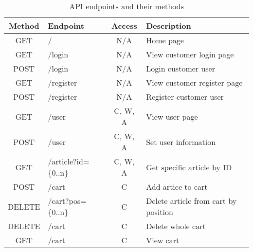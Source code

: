 \documentclass[12pt,a4paper]{report}
\begin{document}
\begin{table}[H]
\centering
\caption{API endpoints and their methods}
\begin{tabular}{|clcl|}
\hline
\textbf{Method}              & \textbf{Endpoint}                             & \textbf{Access}              & \textbf{Description}                 \\ \hline
\multicolumn{1}{|c|}{GET}    & \multicolumn{1}{l|}{/}                        & \multicolumn{1}{c|}{N/A}     & Home page                            \\
\multicolumn{1}{|c|}{GET}    & \multicolumn{1}{l|}{/login}                   & \multicolumn{1}{c|}{N/A}     & View customer login page                      \\
\multicolumn{1}{|c|}{POST}   & \multicolumn{1}{l|}{/login}                   & \multicolumn{1}{c|}{N/A}     & Login customer user                           \\
\multicolumn{1}{|c|}{GET}    & \multicolumn{1}{l|}{/register}                & \multicolumn{1}{c|}{N/A}     & View customer register page                   \\
\multicolumn{1}{|c|}{POST}   & \multicolumn{1}{l|}{/register}                & \multicolumn{1}{c|}{N/A}     & Register customer user                        \\
\multicolumn{1}{|c|}{GET}    & \multicolumn{1}{l|}{/user}                    & \multicolumn{1}{c|}{C, W, A} & View user page                       \\
\multicolumn{1}{|c|}{POST}   & \multicolumn{1}{l|}{/user}                    & \multicolumn{1}{c|}{C, W, A} & Set user information                 \\
\multicolumn{1}{|c|}{GET}    & \multicolumn{1}{l|}{/article?id=\{0..n\}}     & \multicolumn{1}{c|}{C, W, A} & Get specific article by ID           \\
\multicolumn{1}{|c|}{POST}   & \multicolumn{1}{l|}{/cart}                    & \multicolumn{1}{c|}{C}       & Add artice to cart                   \\
\multicolumn{1}{|l|}{DELETE} & \multicolumn{1}{l|}{/cart?pos=\{0..n\}}       & \multicolumn{1}{c|}{C}       & Delete article from cart by position \\
\multicolumn{1}{|l|}{DELETE} & \multicolumn{1}{l|}{/cart}                    & \multicolumn{1}{c|}{C}       & Delete whole cart                    \\
\multicolumn{1}{|c|}{GET}    & \multicolumn{1}{l|}{/cart}                    & \multicolumn{1}{c|}{C}       & View cart                            \\

\end{tabular}
\end{table}
\end{document}
